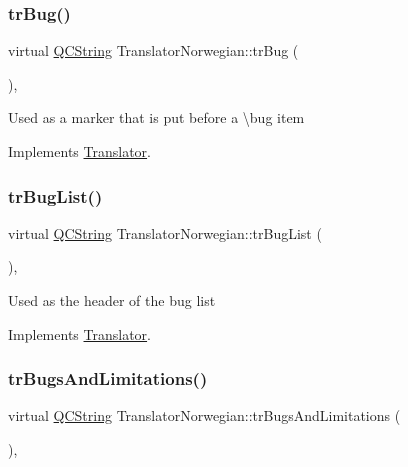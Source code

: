 \subsubsection{\texorpdfstring{trBug()}{trBug()}}
{\footnotesize\ttfamily virtual \mbox{\hyperlink{class_q_c_string}{Q\+C\+String}} Translator\+Norwegian\+::tr\+Bug (\begin{DoxyParamCaption}{ }\end{DoxyParamCaption})\hspace{0.3cm}{\ttfamily [inline]}, {\ttfamily [virtual]}}

Used as a marker that is put before a \textbackslash{}bug item 

Implements \mbox{\hyperlink{class_translator}{Translator}}.

\mbox{\label{class_translator_norwegian_a9d04b3b040287b449284f228ba50dd92}} 
\subsubsection{\texorpdfstring{trBugList()}{trBugList()}}
{\footnotesize\ttfamily virtual \mbox{\hyperlink{class_q_c_string}{Q\+C\+String}} Translator\+Norwegian\+::tr\+Bug\+List (\begin{DoxyParamCaption}{ }\end{DoxyParamCaption})\hspace{0.3cm}{\ttfamily [inline]}, {\ttfamily [virtual]}}

Used as the header of the bug list 

Implements \mbox{\hyperlink{class_translator}{Translator}}.

\mbox{\label{class_translator_norwegian_a17a24abd1755843a02c90fb423414769}} 
\subsubsection{\texorpdfstring{trBugsAndLimitations()}{trBugsAndLimitations()}}
{\footnotesize\ttfamily virtual \mbox{\hyperlink{class_q_c_string}{Q\+C\+String}} Translator\+Norwegian\+::tr\+Bugs\+And\+Limitations (\begin{DoxyParamCaption}{ }\end{DoxyParamCaption})\hspace{0.3cm}{\ttfamily [inline]}, {\ttfamily [virtual]}}

